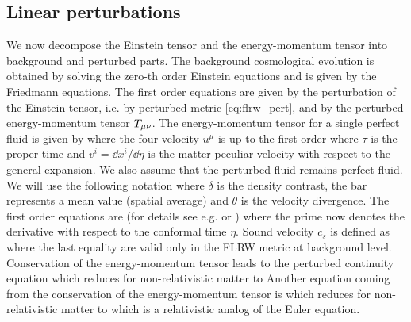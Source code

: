 \subsection{Linear perturbations}
We now decompose the Einstein tensor and the energy-momentum tensor into background and perturbed parts. The background cosmological evolution is obtained by solving the zero-th order Einstein equations and is given by the Friedmann equations. The first order equations are given by the perturbation of the Einstein tensor, i.e. by perturbed metric \eqref{eq:flrw_pert}, and by the perturbed energy-momentum tensor $T_{\mu\nu}$. The energy-momentum tensor for a single perfect fluid is given by
where the four-velocity $u^\mu$ is up to the first order
where $\tau$ is the proper time and $v^i=\dd x^i/\dd\eta$ is the matter peculiar velocity with respect to the general expansion. We also assume that the perturbed fluid remains perfect fluid. We will use the following notation
where $\delta$ is the density contrast, the bar represents a mean value (spatial average) and $\theta$ is the velocity divergence. The first order equations are (for details see e.g. \cite{2002col.luc..cosmology} or \cite{10.1143/PTPS.78.1})
where the prime now denotes the derivative with respect to the conformal time $\eta$. Sound velocity $c_s$ is defined as
where the last equality are valid only in the FLRW metric at background level. Conservation of the energy-momentum tensor leads to the perturbed continuity equation
which reduces for non-relativistic matter to
Another equation coming from the conservation of the energy-momentum tensor is
which reduces for non-relativistic matter to
which is a relativistic analog of the Euler equation.



